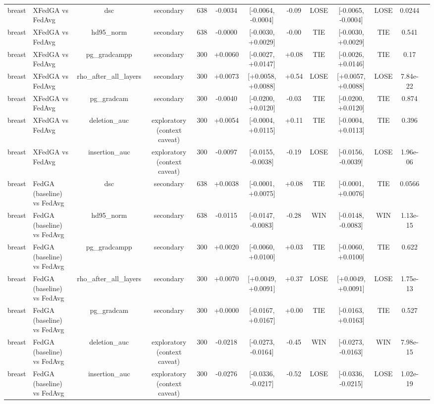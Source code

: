 \begin{tabular}{llccccccccccc}
breast & XFedGA vs FedAvg & dsc & secondary & 638 & -0.0034 & [-0.0064, -0.0004] & -0.09 & LOSE & [-0.0065, -0.0004] & LOSE & 0.0244 &  \\
breast & XFedGA vs FedAvg & hd95\_norm & secondary & 638 & -0.0000 & [-0.0030, +0.0029] & -0.00 & TIE & [-0.0030, +0.0029] & TIE & 0.541 &  \\
breast & XFedGA vs FedAvg & pg\_gradcampp & secondary & 300 & +0.0060 & [-0.0027, +0.0147] & +0.08 & TIE & [-0.0026, +0.0146] & TIE & 0.17 &  \\
breast & XFedGA vs FedAvg & rho\_after\_all\_layers & secondary & 300 & +0.0073 & [+0.0058, +0.0088] & +0.54 & LOSE & [+0.0057, +0.0088] & LOSE & 7.84e-22 &  \\
breast & XFedGA vs FedAvg & pg\_gradcam & secondary & 300 & -0.0040 & [-0.0200, +0.0120] & -0.03 & TIE & [-0.0200, +0.0120] & TIE & 0.874 &  \\
breast & XFedGA vs FedAvg & deletion\_auc & exploratory (context caveat) & 300 & +0.0054 & [-0.0004, +0.0115] & +0.11 & TIE & [-0.0004, +0.0113] & TIE & 0.396 &  \\
breast & XFedGA vs FedAvg & insertion\_auc & exploratory (context caveat) & 300 & -0.0097 & [-0.0155, -0.0038] & -0.19 & LOSE & [-0.0156, -0.0039] & LOSE & 1.96e-06 &  \\
breast & FedGA (baseline) vs FedAvg & dsc & secondary & 638 & +0.0038 & [-0.0001, +0.0075] & +0.08 & TIE & [-0.0001, +0.0076] & TIE & 0.0566 &  \\
breast & FedGA (baseline) vs FedAvg & hd95\_norm & secondary & 638 & -0.0115 & [-0.0147, -0.0083] & -0.28 & WIN & [-0.0148, -0.0083] & WIN & 1.13e-15 &  \\
breast & FedGA (baseline) vs FedAvg & pg\_gradcampp & secondary & 300 & +0.0020 & [-0.0060, +0.0100] & +0.03 & TIE & [-0.0060, +0.0100] & TIE & 0.622 &  \\
breast & FedGA (baseline) vs FedAvg & rho\_after\_all\_layers & secondary & 300 & +0.0070 & [+0.0049, +0.0091] & +0.37 & LOSE & [+0.0049, +0.0091] & LOSE & 1.75e-13 &  \\
breast & FedGA (baseline) vs FedAvg & pg\_gradcam & secondary & 300 & +0.0000 & [-0.0167, +0.0167] & +0.00 & TIE & [-0.0163, +0.0163] & TIE & 0.527 &  \\
breast & FedGA (baseline) vs FedAvg & deletion\_auc & exploratory (context caveat) & 300 & -0.0218 & [-0.0273, -0.0164] & -0.45 & WIN & [-0.0273, -0.0163] & WIN & 7.98e-15 &  \\
breast & FedGA (baseline) vs FedAvg & insertion\_auc & exploratory (context caveat) & 300 & -0.0276 & [-0.0336, -0.0217] & -0.52 & LOSE & [-0.0336, -0.0215] & LOSE & 1.02e-19 &  \\

\end{tabular}
